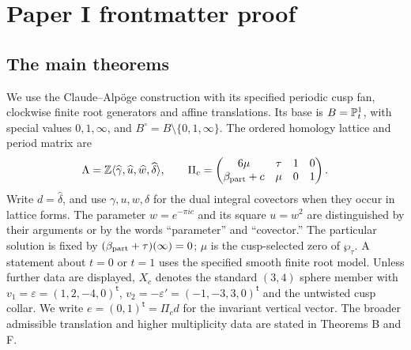 \documentclass[11pt,a4paper]{article}
\theoremstyle{definition}
\begin{document}
\section{Paper I frontmatter proof}

\subsection{The main theorems}
\label{series:I:main-theorems}

We use the Claude--Alp\"oge construction with its specified periodic
cusp fan, clockwise finite root generators and affine translations.
Its base is $B=\mathbb P^1_t$, with special values $0,1,\infty$, and
$B^\circ=B\setminus\{0,1,\infty\}$.  The ordered homology lattice and
period matrix are
\[
 \Lambda=\mathbb Z\langle\widehat\gamma,\widehat u,
                  \widehat w,\widehat\delta\rangle,
 \qquad
 \Pi_c=\begin{pmatrix}6\mu&\tau&1&0\\
                       \beta_{\rm part}+c&\mu&0&1\end{pmatrix}.
\]
Write $d=\widehat\delta$, and use $\gamma,u,w,\delta$ for the dual
integral covectors when they occur in lattice forms.  The parameter
$w=e^{-\pi i c}$ and its square $u=w^2$ are distinguished by their
arguments or by the words ``parameter'' and ``covector.''  The
particular solution is fixed by
$(\beta_{\rm part}+\tau)(\infty)=0$; $\mu$ is the cusp-selected
zero of $\wp_\tau$.  A statement about $t=0$ or $t=1$ uses the
specified smooth finite root model.  Unless further data are
displayed, $X_c$ denotes the standard $(3,4)$ sphere member with
$v_1=\varepsilon=(1,2,-4,0)^{\mathsf t}$,
$v_2=-\varepsilon'=(-1,-3,3,0)^{\mathsf t}$ and the untwisted
cusp collar.  We write $e=(0,1)^{\mathsf t}=\Pi_c d$ for the
invariant vertical vector.  The broader admissible translation and higher
multiplicity data are stated in Theorems B and F.

\hypertarget{main-I-A}{}
\end{document}
